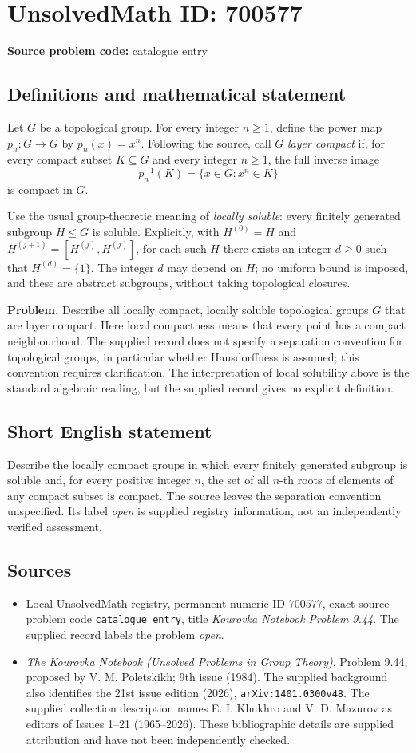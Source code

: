 \documentclass[11pt]{article}
\begin{document}
\section*{UnsolvedMath ID: 700577}
\textbf{Source problem code:} catalogue entry
\subsection{Definitions and mathematical statement}
Let \(G\) be a topological group. For every integer \(n\geq 1\), define the power map \(p_n:G\to G\) by \(p_n(x)=x^n\). Following the source, call \(G\) \emph{layer compact} if, for every compact subset \(K\subseteq G\) and every integer \(n\geq 1\), the full inverse image
\[
 p_n^{-1}(K)=\{x\in G:x^n\in K\}
\]
is compact in \(G\).

Use the usual group-theoretic meaning of \emph{locally soluble}: every finitely generated subgroup \(H\leq G\) is soluble. Explicitly, with \(H^{(0)}=H\) and \(H^{(j+1)}=[H^{(j)},H^{(j)}]\), for each such \(H\) there exists an integer \(d\geq 0\) such that \(H^{(d)}=\{1\}\). The integer \(d\) may depend on \(H\); no uniform bound is imposed, and these are abstract subgroups, without taking topological closures.

\textbf{Problem.} Describe all locally compact, locally soluble topological groups \(G\) that are layer compact. Here local compactness means that every point has a compact neighbourhood. The supplied record does not specify a separation convention for topological groups, in particular whether Hausdorffness is assumed; this convention requires clarification. The interpretation of local solubility above is the standard algebraic reading, but the supplied record gives no explicit definition.
\subsection{Short English statement}
Describe the locally compact groups in which every finitely generated subgroup is soluble and, for every positive integer \(n\), the set of all \(n\)-th roots of elements of any compact subset is compact. The source leaves the separation convention unspecified. Its label \emph{open} is supplied registry information, not an independently verified assessment.
\subsection{Sources}
\begin{itemize}
\item Local UnsolvedMath registry, permanent numeric ID \(700577\), exact source problem code \texttt{catalogue entry}, title \emph{Kourovka Notebook Problem 9.44}. The supplied record labels the problem \emph{open}.
\item \emph{The Kourovka Notebook (Unsolved Problems in Group Theory)}, Problem 9.44, proposed by V. M. Poletskikh; 9th issue (1984). The supplied background also identifies the 21st issue edition (2026), \texttt{arXiv:1401.0300v48}. The supplied collection description names E. I. Khukhro and V. D. Mazurov as editors of Issues 1--21 (1965--2026). These bibliographic details are supplied attribution and have not been independently checked.
\end{itemize}
\end{document}
